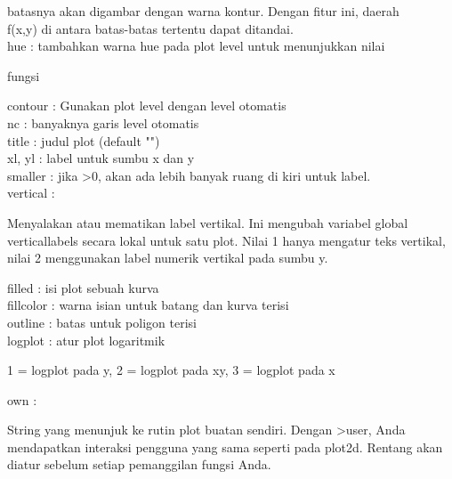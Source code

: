 \documentclass[a4paper,10pt]{article}
\begin{document}
\begin{eulernotebook}
\begin{eulercomment}
\begin{eulercomment}
\begin{eulercomment}
\begin{eulercomment}
\begin{eulercomment}
\begin{eulercomment}
\begin{eulercomment}
batasnya akan digambar dengan warna kontur. Dengan fitur ini, daerah\\
f(x,y) di antara batas-batas tertentu dapat ditandai.
\\
hue       : tambahkan warna hue pada plot level untuk menunjukkan nilai\\
\end{eulercomment}
\begin{eulerttcomment}
            fungsi
\end{eulerttcomment}
\begin{eulercomment}
contour   : Gunakan plot level dengan level otomatis\\
nc        : banyaknya garis level otomatis\\
title     : judul plot (default "")\\
xl, yl    : label untuk sumbu x dan y\\
smaller   : jika \textgreater{}0, akan ada lebih banyak ruang di kiri untuk label.\\
vertical  :\\
\end{eulercomment}
\begin{eulerttcomment}
  Menyalakan atau mematikan label vertikal. Ini mengubah variabel global
  verticallabels secara lokal untuk satu plot. Nilai 1 hanya mengatur teks
  vertikal, nilai 2 menggunakan label numerik vertikal pada sumbu y.
\end{eulerttcomment}
\begin{eulercomment}
filled    : isi plot sebuah kurva\\
fillcolor : warna isian untuk batang dan kurva terisi\\
outline   : batas untuk poligon terisi\\
logplot   : atur plot logaritmik\\
\end{eulercomment}
\begin{eulerttcomment}
            1 = logplot pada y,
            2 = logplot pada xy,
            3 = logplot pada x
\end{eulerttcomment}
\begin{eulercomment}
own       :\\
\end{eulercomment}
\begin{eulerttcomment}
  String yang menunjuk ke rutin plot buatan sendiri. Dengan >user, Anda
  mendapatkan interaksi pengguna yang sama seperti pada plot2d. Rentang akan
  diatur sebelum setiap pemanggilan fungsi Anda.

\end{eulerttcomment}
\end{eulercomment}
\end{eulercomment}
\end{eulercomment}
\end{eulercomment}
\end{eulercomment}
\end{eulercomment}
\end{eulernotebook}
\end{document}
